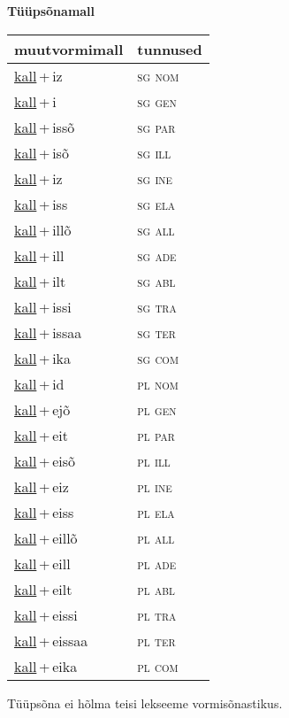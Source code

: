 
\vspace{1.8em}
\begin{minipage}{\textwidth}
\textbf{Tüüpsõnamall \,}\\

\begin{sideways}
\begin{tabular}{l l}
muutvormimall & tunnused \\
\hline
\underline{kall}\,+\,iz & \textsc{ sg nom } \\
\underline{kall}\,+\,i & \textsc{ sg gen } \\
\underline{kall}\,+\,issõ & \textsc{ sg par } \\
\underline{kall}\,+\,isõ & \textsc{ sg ill } \\
\underline{kall}\,+\,iz & \textsc{ sg ine } \\
\underline{kall}\,+\,iss & \textsc{ sg ela } \\
\underline{kall}\,+\,illõ & \textsc{ sg all } \\
\underline{kall}\,+\,ill & \textsc{ sg ade } \\
\underline{kall}\,+\,ilt & \textsc{ sg abl } \\
\underline{kall}\,+\,issi & \textsc{ sg tra } \\
\underline{kall}\,+\,issaa & \textsc{ sg ter } \\
\underline{kall}\,+\,ika & \textsc{ sg com } \\
\underline{kall}\,+\,id & \textsc{ pl nom } \\
\underline{kall}\,+\,ejõ & \textsc{ pl gen } \\
\underline{kall}\,+\,eit & \textsc{ pl par } \\
\underline{kall}\,+\,eisõ & \textsc{ pl ill } \\
\underline{kall}\,+\,eiz & \textsc{ pl ine } \\
\underline{kall}\,+\,eiss & \textsc{ pl ela } \\
\underline{kall}\,+\,eillõ & \textsc{ pl all } \\
\underline{kall}\,+\,eill & \textsc{ pl ade } \\
\underline{kall}\,+\,eilt & \textsc{ pl abl } \\
\underline{kall}\,+\,eissi & \textsc{ pl tra } \\
\underline{kall}\,+\,eissaa & \textsc{ pl ter } \\
\underline{kall}\,+\,eika & \textsc{ pl com } \\
\end{tabular}
\end{sideways}
\label{tab:tüüpsõnamall-kalliz}

\end{minipage}

 
\vspace{1em}
\noindent Tüüpsõna ei hõlma teisi lekseeme vormi\-sõnastikus.
